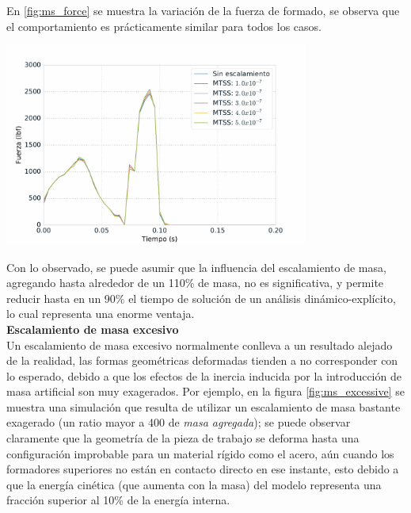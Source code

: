 En \ref{fig:ms_force} se muestra la variación de la fuerza de formado, se observa que el 
comportamiento es prácticamente similar para todos los casos.

\begin{center}
\includegraphics[width=0.75\textwidth]{src/ch4/ms_force.pdf}
\label{fig:ms_force}
\end{center}

Con lo observado, se puede asumir que la influencia del escalamiento de masa, agregando hasta alrededor 
de un 110\% de masa, no es significativa, y permite reducir hasta en un 90\% el tiempo de solución de 
un análisis dinámico-explícito, lo cual representa una enorme ventaja.\\

\textbf{Escalamiento de masa excesivo} \\

Un escalamiento de masa excesivo normalmente conlleva a un resultado alejado de la realidad, las formas 
geométricas deformadas tienden a no corresponder con lo esperado, debido a que los efectos de la inercia 
inducida por la introducción de masa artificial son muy exagerados. Por ejemplo, en la figura 
\ref{fig:ms_excessive} se muestra una simulación que resulta de utilizar un escalamiento de masa bastante 
exagerado (un ratio mayor a 400 de \textit{masa agregada}); se puede observar claramente que la geometría 
de la pieza de trabajo se deforma hasta una configuración improbable para un material rígido como el acero, 
aún cuando los formadores superiores no están en contacto directo en ese instante, esto debido a que la 
energía cinética (que aumenta con la masa) del modelo representa una fracción superior al 10\% de la 
energía interna.\\

